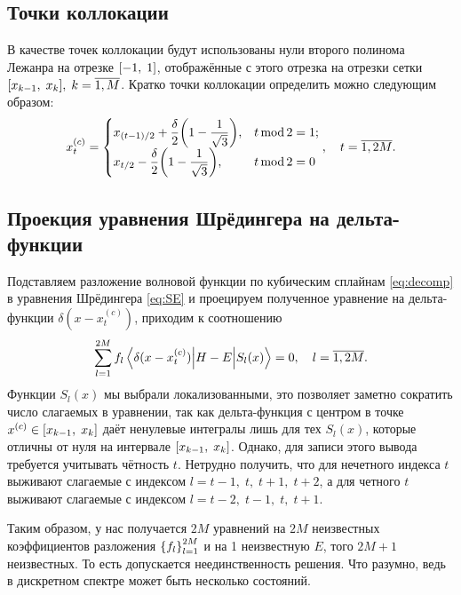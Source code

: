 \documentclass[10pt]{article}
\begin{document}
\subsection{Точки коллокации}

В качестве точек коллокации будут использованы нули второго полинома Лежанра на отрезке $\qty[-1,\;1]$, отображённые с этого отрезка на отрезки сетки $\qty[x_{k-1},\;x_{k}],\; k=\overline{1,M}$. Кратко точки коллокации определить можно следующим образом:
\begin{equation}
    x^{(c)}_t =
    \begin{cases}
        x_{(t-1)/2} + \dfrac{\delta}{2} \qty(1 - \dfrac{1}{\sqrt{3}}), &{t\,\textrm{mod}\,2 = 1};\\
        x_{t/2} - \dfrac{\delta}{2} \qty(1 - \dfrac{1}{\sqrt{3}}), &{t\,\textrm{mod}\,2 = 0}
    \end{cases}
    ,\quad t = \overline{1, 2M}.
\end{equation}

\subsection{Проекция уравнения Шрёдингера на дельта-функции}

Подставляем разложение волновой функции по кубическим сплайнам \eqref{eq:decomp} в уравнения Шрёдингера \eqref{eq:SE} и проецируем полученное уравнение на дельта-функции $\delta(x-x^{(c)}_t)$, приходим к соотношению
\begin{equation}
    \sum\limits_{l=1}^{2M} f_{l}
    \mel**{\delta(x-x^{(c)}_t)}{H-E}{S_{l}(x)}=0,\quad l=\overline{1,2M}.
\end{equation}
Функции $S_l(x)$ мы выбрали локализованными, это позволяет заметно сократить число слагаемых в уравнении, так как дельта-функция с центром в точке $x^{(c)}\in\qty[x_{k-1},\;x_{k}]$ даёт ненулевые интегралы лишь для тех $S_l(x)$, которые отличны от нуля на интервале $\qty[x_{k-1},\;x_{k}]$. Однако, для записи этого вывода требуется учитывать чётность $t$. Нетрудно получить, что для нечетного индекса $t$ выживают слагаемые с индексом $l=t-1,\;t,\;t+1,\;t+2$, а для четного $t$ выживают слагаемые с индексом $l=t-2,\;t-1,\;t,\;t+1$.

Таким образом, у нас получается $2M$ уравнений на $2M$ неизвестных коэффициентов разложения $\qty{f_l}_{l=1}^{2M}$ и на 1 неизвестную $E$, того $2M+1$ неизвестных. То есть допускается неединственность решения. Что разумно, ведь в дискретном спектре может быть несколько состояний.
\end{document}
